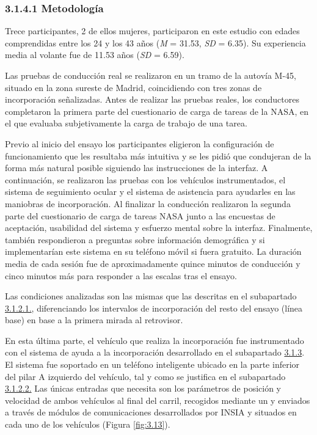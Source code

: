 \subsubsection{3.1.4.1	Metodología}\label{3141}

Trece participantes, 2 de ellos mujeres, participaron en este estudio con edades comprendidas entre los 24 y los 43 años (\emph{M} = 31.53, \emph{SD} = 6.35). Su experiencia media al volante fue de 11.53 años (\emph{SD} = 6.59). 

Las pruebas de conducción real se realizaron en un tramo de la autovía M-45, situado en la zona sureste de Madrid, coincidiendo con tres zonas de incorporación señalizadas. Antes de realizar las pruebas reales, los conductores completaron la primera parte del cuestionario de carga de tareas de la NASA, en el que evaluaba subjetivamente la carga de trabajo de una tarea. 

Previo al inicio del ensayo los participantes eligieron la configuración de funcionamiento que les resultaba más intuitiva y se les pidió que condujeran de la forma más natural posible siguiendo las instrucciones de la interfaz. A continuación, se realizaron las pruebas con los vehículos instrumentados, el sistema de seguimiento ocular y el sistema de asistencia para ayudarles en las maniobras de incorporación.  Al finalizar la conducción realizaron la segunda parte del cuestionario de carga de tareas NASA junto a las encuestas de aceptación, usabilidad del sistema y esfuerzo mental sobre la interfaz. Finalmente, también respondieron a preguntas sobre información demográfica y si implementarían este sistema en su teléfono móvil si fuera gratuito. La duración media de cada sesión fue de aproximadamente quince minutos de conducción y cinco minutos más para responder a las escalas tras el ensayo. 

Las condiciones analizadas son las mismas que las descritas en el subapartado \hyperref[3121]{3.1.2.1.}, diferenciando los intervalos de incorporación del resto del ensayo (línea base) en base a la primera mirada al retrovisor. 

En esta última parte, el vehículo que realiza la incorporación fue instrumentado con el sistema de ayuda a la incorporación desarrollado en el subapartado \hyperref[313]{3.1.3}. El sistema fue soportado en un teléfono inteligente ubicado en la parte inferior del pilar A izquierdo del vehículo, tal y como se justifica en el subapartado \hyperref[3122]{3.1.2.2.} Las únicas entradas que necesita son los parámetros de posición y velocidad de ambos vehículos al final del carril, recogidos mediante un y enviados a través de módulos de comunicaciones desarrollados por INSIA y situados en cada uno de los vehículos (Figura \ref{fig:3.13}).

